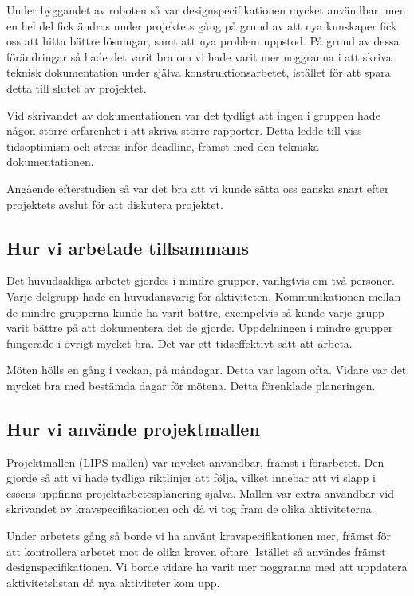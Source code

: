 \documentclass[a4paper,12pt]{article}
\begin{document}
Under byggandet av roboten så var designspecifikationen mycket användbar, men en hel del fick ändras under projektets gång på grund av
att nya kunskaper fick oss att hitta bättre lösningar, samt att nya problem uppstod. På grund av dessa förändringar så hade det varit bra om vi
hade varit mer noggranna i att skriva teknisk dokumentation under själva konstruktionsarbetet, istället för att spara detta till slutet av projektet. 

Vid skrivandet av dokumentationen var det tydligt att ingen i gruppen hade någon större erfarenhet i att skriva större rapporter. Detta ledde till
viss tidsoptimism och stress inför deadline, främst med den tekniska dokumentationen. 

Angående efterstudien så var det bra att vi kunde sätta oss ganska snart efter projektets avslut för att diskutera projektet. 

\subsection{Hur vi arbetade tillsammans}
Det huvudsakliga arbetet gjordes i mindre grupper, vanligtvis om två personer. Varje delgrupp hade en huvudansvarig för aktiviteten. 
Kommunikationen mellan de mindre grupperna kunde ha varit bättre, exempelvis så kunde varje grupp varit bättre på att dokumentera
det de gjorde. Uppdelningen i mindre grupper fungerade i övrigt mycket bra. Det var ett tidseffektivt sätt att arbeta. 

Möten hölls en gång i veckan, på måndagar. Detta var lagom ofta. Vidare var det mycket bra med bestämda dagar för mötena. Detta förenklade 
planeringen. 

\subsection{Hur vi använde projektmallen}
Projektmallen (LIPS-mallen) var mycket användbar, främst i förarbetet. Den gjorde så att vi hade tydliga riktlinjer att följa, vilket innebar att vi 
slapp i essens uppfinna projektarbetesplanering själva. Mallen var extra användbar vid skrivandet av kravspecifikationen och då vi tog fram 
de olika aktiviteterna. 

Under arbetets gång så borde vi ha använt kravspecifikationen mer, främst för att kontrollera arbetet mot de olika kraven oftare. Istället så
användes främst designspecifikationen. Vi borde vidare ha varit mer noggranna med att uppdatera aktivitetslistan då nya aktiviteter kom upp. 
\end{document}

